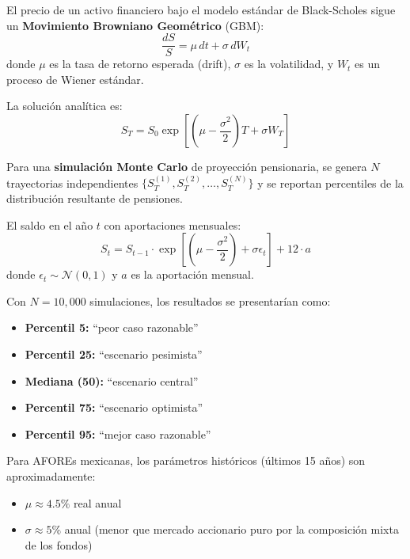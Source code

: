\documentclass[11pt,a4paper]{report}
\begin{document}
\begin{tcolorbox}[colback=blue!5!white, colframe=blue!75!black, title=\textbf{Definici\'on Formal: Movimiento Browniano Geom\'etrico y Simulaci\'on Monte Carlo}, breakable]
El precio de un activo financiero bajo el modelo est\'andar de Black-Scholes sigue un \textbf{Movimiento Browniano Geom\'etrico} (GBM):
\[
  \frac{dS}{S} = \mu \, dt + \sigma \, dW_t
\]
donde $\mu$ es la tasa de retorno esperada (drift), $\sigma$ es la volatilidad, y $W_t$ es un proceso de Wiener est\'andar.

La soluci\'on anal\'itica es:
\[
  S_T = S_0 \exp\left[\left(\mu - \frac{\sigma^2}{2}\right)T + \sigma W_T\right]
\]

Para una \textbf{simulaci\'on Monte Carlo} de proyecci\'on pensionaria, se genera $N$ trayectorias independientes $\{S_T^{(1)}, S_T^{(2)}, \ldots, S_T^{(N)}\}$ y se reportan percentiles de la distribuci\'on resultante de pensiones.

El saldo en el a\~no $t$ con aportaciones mensuales:
\[
  S_t = S_{t-1} \cdot \exp\left[\left(\mu - \frac{\sigma^2}{2}\right) + \sigma \epsilon_t\right] + 12 \cdot a
\]
donde $\epsilon_t \sim \mathcal{N}(0,1)$ y $a$ es la aportaci\'on mensual.

Con $N = 10,000$ simulaciones, los resultados se presentar\'ian como:
\begin{itemize}
  \item \textbf{Percentil 5:} ``peor caso razonable''
  \item \textbf{Percentil 25:} ``escenario pesimista''
  \item \textbf{Mediana (50):} ``escenario central''
  \item \textbf{Percentil 75:} ``escenario optimista''
  \item \textbf{Percentil 95:} ``mejor caso razonable''
\end{itemize}

Para AFOREs mexicanas, los par\'ametros hist\'oricos (\'ultimos 15 a\~nos) son aproximadamente:
\begin{itemize}
  \item $\mu \approx 4.5\%$ real anual
  \item $\sigma \approx 5\%$ anual (menor que mercado accionario puro por la composici\'on mixta de los fondos)
\end{itemize}
\end{tcolorbox}
\end{document}
